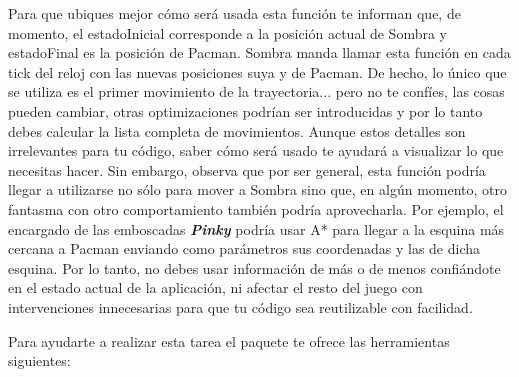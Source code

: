 Para que ubiques mejor cómo será usada esta función te informan que, de momento, el estadoInicial corresponde a la posición actual de Sombra y estadoFinal es la posición de Pacman.  Sombra manda llamar esta función en cada tick del reloj con las nuevas posiciones suya y de Pacman.  De hecho, lo único que se utiliza es el primer movimiento de la trayectoria... pero no te confíes, las cosas pueden cambiar, otras optimizaciones podrían ser introducidas y por lo tanto debes calcular la lista completa de movimientos.  Aunque estos detalles son irrelevantes para tu código, saber cómo será usado te ayudará a visualizar lo que necesitas hacer.  Sin embargo, observa que por ser general, esta función podría llegar a utilizarse no sólo para mover a Sombra sino que, en algún momento, otro fantasma con otro comportamiento también podría aprovecharla.  Por ejemplo, el encargado de las emboscadas \textbf{\textit{Pinky}} podría usar A* para llegar a la esquina más cercana a Pacman enviando como parámetros sus coordenadas y las de dicha esquina.  Por lo tanto, no debes usar información de más o de menos confiándote en el estado actual de la aplicación, ni afectar el resto del juego con intervenciones innecesarias para que tu código sea reutilizable con facilidad.

Para ayudarte a realizar esta tarea el paquete te ofrece las herramientas siguientes:

